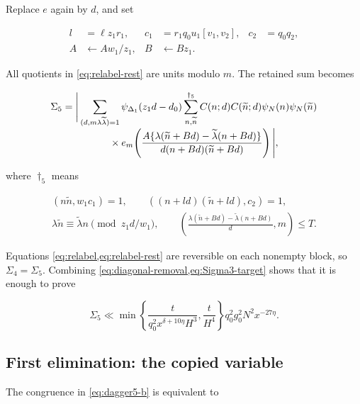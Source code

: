 Replace $e$ again by $d$, and set

\begin{equation}\label{eq:relabel-rest}
 \begin{aligned}
 l&=\ell z_1r_1,&
 c_1&=r_1q_0u_1[v_1,v_2],& c_2&=q_0q_2,\\
 A&\leftarrow Aw_1/z_1,&
 B&\leftarrow Bz_1.
 \end{aligned}
\end{equation}

All quotients in \cref{eq:relabel-rest} are units modulo $m$.
The retained sum becomes

\begin{align}
\Sigma_5={}&\Bigg|
 \sum_{(d,m\lambda\widetilde\lambda)=1}
 \psi_{\Delta_1}(z_1d-d_0)
 \sum_{n,\widetilde n}^{\dagger_5}
 C(n;d)C(\widetilde n;d)\psi_N(n)\psi_N(\widetilde n)
 \notag\\[-1mm]
&\hspace{12mm}\times
 e_m\!\left(
 \frac{A\{\lambda(\widetilde n+Bd)-
 \widetilde\lambda(n+Bd)\}}
 {d(n+Bd)(\widetilde n+Bd)}
 \right)\Bigg|,
 \label{eq:Sigma5}
\end{align}

where $\dagger_5$ means

\begin{gather}
 (n\widetilde n,w_1c_1)=1,\qquad
 ((n+ld)(\widetilde n+ld),c_2)=1,
 \label{eq:dagger5-a}\\
 \lambda\widetilde n\equiv\widetilde\lambda n
 \pmod{z_1d/w_1},\qquad
 \left(
 \frac{\lambda(\widetilde n+Bd)-\widetilde\lambda(n+Bd)}d,m
 \right)\le T.
 \label{eq:dagger5-b}
\end{gather}

Equations \cref{eq:relabel,eq:relabel-rest} are reversible on each nonempty
block, so $\Sigma_4=\Sigma_5$.  Combining
\cref{eq:diagonal-removal,eq:Sigma3-target} shows that it is enough to prove

\begin{equation}\label{eq:Sigma5-target}
 \Sigma_5\ll
 \min\left\{\frac{t}{q_0^2x^{\delta+10\eta}H^3},
              \frac{t}{H^4}\right\}
 q_0^2g_0^2N^2x^{-27\eta}.
\end{equation}

\subsection{First elimination: the copied variable}

The congruence in \cref{eq:dagger5-b} is equivalent to

